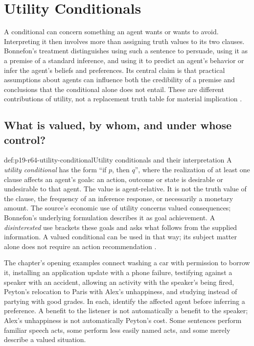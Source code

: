 \chapter{Utility Conditionals}
\label{sec:p19-rationality-6-4}

A conditional can concern something an agent wants or wants to avoid.
Interpreting it then involves more than assigning truth values to its two
clauses. Bonnefon's treatment distinguishes using such a sentence to persuade,
using it as a premise of a standard inference, and using it to predict an
agent's behavior or infer the agent's beliefs and preferences. Its central
claim is that practical assumptions about agents can influence both the
credibility of a premise and conclusions that the conditional alone does not
entail. These are different contributions of utility, not a replacement truth
table for material implication \cite[Secs.~1--4, pp.~419--422]{Bonnefon2021Utility}.

\section{What is valued, by whom, and under whose control?}
\label{sec:p19-r64-utility-meaning}

\begin{hbdefinition}{def:p19-r64-utility-conditional}{Utility conditionals and their interpretation}
A \emph{utility conditional} has the form ``if \(p\), then \(q\)'',
where the realization of at least one clause affects an agent's goals:
an action, outcome or state is desirable or undesirable to that agent.
The value is agent-relative. It is not the truth value of the clause,
the frequency of an inference response, or necessarily a monetary amount.
The source's economic use of utility concerns valued consequences;
Bonnefon's underlying formulation describes it as goal achievement.
A \emph{disinterested} use brackets these goals and asks what follows from
the supplied information. A valued conditional can be used in that way;
its subject matter alone does not require an action recommendation
\cite[pp.~888--891]{Bonnefon2009UtilityTheory}.
\end{hbdefinition}

The chapter's opening examples connect washing a car with permission to
borrow it, installing an application update with a phone failure, testifying
against a speaker with an accident, allowing an activity with the speaker's
being fired, Peyton's relocation to Paris with Alex's unhappiness, and studying
instead of partying with good grades. In each, identify the affected agent
before inferring a preference. A benefit to the listener is not automatically
a benefit to the speaker; Alex's unhappiness is not automatically Peyton's
cost. Some sentences perform familiar speech acts, some perform less easily
named acts, and some merely describe a valued situation.

